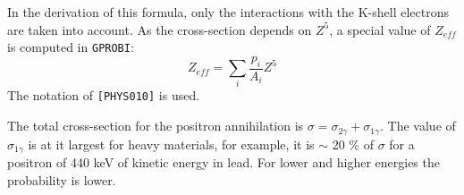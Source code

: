 In the derivation of this formula, only the interactions with
the K-shell electrons are taken into account.
As the cross-section depends on $Z^5$, a special value of $Z_{eff}$
is computed in {\tt GPROBI}:
\begin{equation}
Z_{eff} = \sum_i \frac{p_i}{A_i} Z^5
\end{equation}
The notation of {\tt [PHYS010]} is used.

The total cross-section for the positron annihilation is
$\sigma = \sigma_{2\gamma} + \sigma_{1\gamma}$.
The value of $\sigma_{1\gamma}$ is at it largest for heavy
materials, for example, it is $\sim$ 20 \% of $\sigma$ for a positron
of 440 keV of kinetic energy in lead. For lower and higher
energies the probability is lower.
